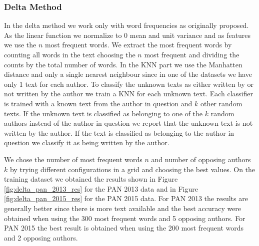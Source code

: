\subsubsection{Delta Method}
In the delta method we work only with word frequencies as originally proposed.
As the linear function we normalize to 0 mean and unit variance and as features
we use the $n$ most frequent words. We extract the most frequent words by
counting all words in the text choosing the $n$ most frequent and dividing the
counts by the total number of words. In the \gls{KNN} part we use the Manhatten
distance and only a single nearest neighbour since in one of the datasets we
have only 1 text for each author. To classify the unknown texts as either
written by or not written by the author we train a \gls{KNN} for each unknown
text.  Each classifier is trained with a known text from the author in question
and $k$ other random texts. If the unknown text is classified as belonging
to one of the $k$ random authors instead of the author in question we report
that the unknown text is not written by the author. If the text is classified
as belonging to the author in question we classify it as being written by the
author.

We chose the number of most frequent words $n$ and number of opposing
authors $k$ by trying different configurations in a grid and choosing the
best values. On the training dataset we obtained the results shown in
Figure \ref{fig:delta_pan_2013_res} for the PAN 2013 data and in Figure
\ref{fig:delta_pan_2015_res} for the PAN 2015 data. For PAN 2013 the results are
generally better since there is more text available and the best accuracy were
obtained when using the 300 most frequent words and 5 opposing authors. For PAN
2015 the best result is obtained when using the 200 most frequent words and 2
opposing authors.


